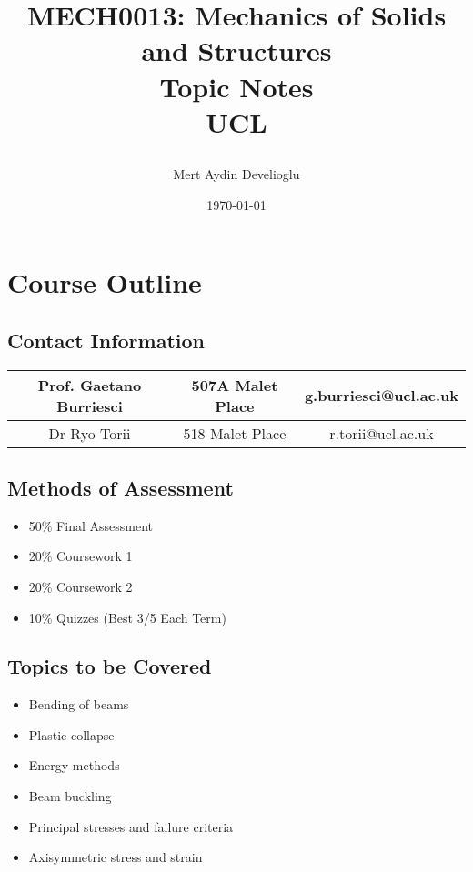 \documentclass[12pt]{report}
\numberwithin{equation}{section}
\begin{document}
\title{
  {MECH0013: Mechanics of Solids and Structures\\Topic Notes}\\
  \vspace{36pt}
  {\Large UCL}
  \author{\Large Mert Aydin Develioglu}
  \date{\Large \today}
}
\maketitle
\doublespacing
\tableofcontents
\singlespacing

\chapter*{Course Outline}
\section*{Contact Information}
\begin{center}
    \begin{tabular}{ |c|c|c| } 
     \hline
     Prof. Gaetano Burriesci & 507A Malet Place & g.burriesci@ucl.ac.uk \\ 
     \hline
     Dr Ryo Torii & 518 Malet Place & r.torii@ucl.ac.uk \\
     \hline
    \end{tabular}
\end{center}

\section*{Methods of Assessment}
\begin{itemize}[noitemsep]
    \item 50\% Final Assessment
    \item 20\% Coursework 1
    \item 20\% Coursework 2
    \item 10\% Quizzes (Best 3/5 Each Term)
\end{itemize}

\section*{Topics to be Covered}
\begin{itemize}[noitemsep]
    \item Bending of beams
    \item Plastic collapse
    \item Energy methods
    \item Beam buckling
    \item Principal stresses and failure criteria
    \item Axisymmetric stress and strain
\end{itemize}
\end{document}
